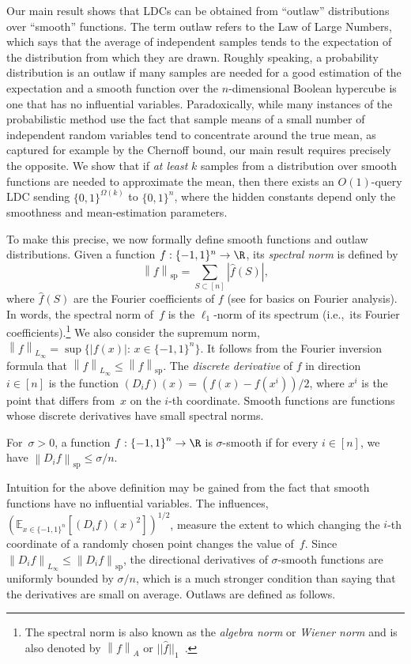 \documentclass{toc}
\newcommand{\bset}[1]{\{0,1\}^{#1}} %
\newcommand{\pmset}[1]{\{-1,1\}^{#1}} %
\newcommand{\sBC}{{\{-1,1\}}}
\newcommand{\Exp}{{\mathbb{E}}}
\newcommand{\specnorm}[1]{\left\lVert #1 \right\rVert_{\mathrm{sp}}}
\newcommand{\norm}[1]{\left\lVert #1\right\rVert}
\newcommand{\st}{:\,} %
\begin{document}
Our main result shows that LDCs can be obtained from ``outlaw'' distributions over ``smooth'' functions.
The term outlaw refers to the Law of Large Numbers, which says that the average of independent samples tends to the expectation of the distribution from which they are drawn.
Roughly speaking, a probability distribution is an outlaw if many samples are needed for  a good estimation of the expectation
and
a smooth function over the $n$-dimensional Boolean hypercube is one that has no influential variables.
Paradoxically, while many instances of the probabilistic method use the fact that sample means of a small number of independent random variables tend to concentrate around the true mean, as captured for example by the Chernoff bound, our main result requires precisely the opposite. 
We show that if \emph{at least} $k$ samples from a distribution over smooth functions are needed to approximate the mean, then there exists an $O(1)$-query LDC sending $\bset{\Omega(k)}$ to $\bset{n}$, where the hidden constants depend only the smoothness and mean-estimation parameters.

To make this precise, we now formally define smooth functions and outlaw distributions. 
Given a function $f:\pmset{n}\to \R$, its \emph{spectral norm} is defined by
$$
\specnorm{f} =\sum_{S\subset [n]}|\widehat{f}(S)|,
$$
where $\widehat{f}(S)$ are the Fourier coefficients of $f$ (see  for basics on Fourier analysis). In words, the spectral norm of~$f$ is the $\ell_1$-norm of its spectrum (i.e.,\ its Fourier coefficients).\footnote{ 
The spectral norm is also known as the \emph{algebra norm} or \emph{Wiener norm} and is also denoted by $\norm{f}_A$ or $||\hat{f}||_{1}$~\cite{GreenSanders:2008,ShpilkaTV17}.}
We also consider the supremum norm, $\norm{f}_{L_\infty}=\sup\{|f(x)| \st x\in \pmset{n}\}$.
It follows from the Fourier inversion formula that $\norm{f}_{L_\infty}\le \specnorm{f}$. The \emph{discrete derivative} of $f$ in direction~$i\in[n]$ is the function $(D_if)(x) = (f(x) - f(x^i))/2$, where $x^i$ is the point that differs from~$x$ on the $i$-th %
coordinate. 
Smooth functions are functions whose discrete derivatives have small spectral norms.

\begin{definition}
For~$\sigma>0$, a function $f:\sBC^n\to \R$ is $\sigma$-smooth if for every $i\in [n]$, we have $\specnorm{D_if}\le \sigma/n$.
\end{definition}

Intuition for the above definition may be gained from the fact that smooth functions have no influential variables.
The influences, $(\Exp_{x\in\pmset{n}}[(D_if)(x)^2])^{1/2}$, measure the extent to which changing the $i$-th %
coordinate of a randomly chosen point changes the value of~$f$. Since $\norm{D_if}_{L_\infty}\le \specnorm{D_if}$, the directional derivatives of $\sigma$-smooth functions are uniformly bounded by $\sigma/n$, which is a much stronger condition than saying that the derivatives are small on average.
Outlaws are defined as follows.
\end{document}
